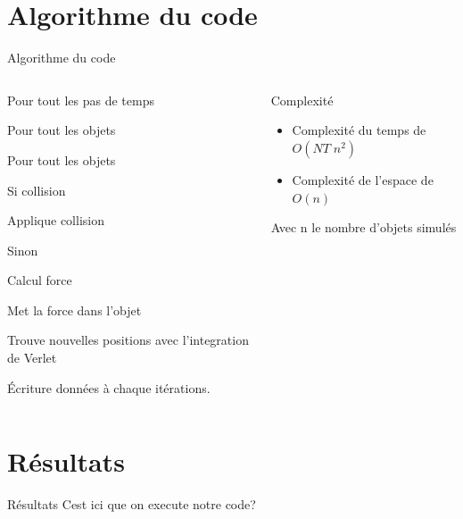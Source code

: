 \documentclass[aspectratio=169,xcolor=dvipsnames]{beamer}
\begin{document}
\section{Algorithme du code}
\begin{frame}{Algorithme du code}
    \begin{columns}
        \begin{column}[]{0.7\textwidth}
            \begin{itemize}
                \item[] Pour tout les pas de temps 
                {\setlength\itemindent{15pt} \item[] Pour tout les objets}
                {\setlength\itemindent{30pt} \item[] Pour tout les objets }
                {\setlength\itemindent{45pt} \item[] Si collision }
                {\setlength\itemindent{60pt} \item[] Applique collision}
                {\setlength\itemindent{45pt} \item[] Sinon}
                {\setlength\itemindent{60pt} \item[] Calcul force}
                {\setlength\itemindent{15pt} \item[] Met la force dans l'objet}
                \item[] Trouve nouvelles positions avec l'integration de Verlet 
                \item[] Écriture données à chaque itérations.
            \end{itemize}
        \end{column}
        \begin{column}[]{0.35\textwidth}
            \begin{block}{Complexité}
                \begin{itemize}
                    \item Complexité du temps de $O(NT\;n^2)$ 
                    \item Complexité de l'espace de $O(n)$
                \end{itemize}
                Avec n le nombre d'objets simulés
            \end{block}
        \end{column}
    \end{columns}
\end{frame}

\section{Résultats}
\begin{frame}{Résultats}
    Cest ici que on execute notre code?
\end{frame}
\end{document}
